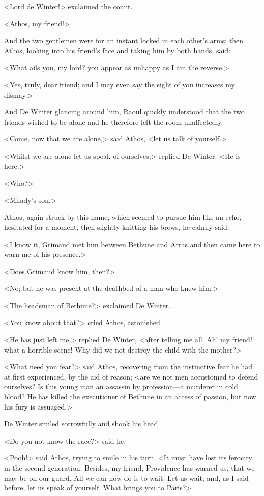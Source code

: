 <Lord de Winter!> exclaimed the count.

<Athos, my friend!>

And the two gentlemen were for an instant locked in each other's arms; then Athos, looking into his friend's face and taking him by both hands, said:

<What ails you, my lord? you appear as unhappy as I am the reverse.>

<Yes, truly, dear friend; and I may even say the sight of you increases my dismay.>

And De Winter glancing around him, Raoul quickly understood that the two friends wished to be alone and he therefore left the room unaffectedly.

<Come, now that we are alone,> said Athos, <let us talk of yourself.>

<Whilst we are alone let us speak of ourselves,> replied De Winter. <He is here.>

<Who?>

<Milady's son.>

Athos, again struck by this name, which seemed to pursue him like an echo, hesitated for a moment, then slightly knitting his brows, he calmly said:

<I know it, Grimaud met him between Bethune and Arras and then came here to warn me of his presence.>

<Does Grimaud know him, then?>

<No; but he was present at the deathbed of a man who knew him.>

<The headsman of Bethune?> exclaimed De Winter.

<You know about that?> cried Athos, astonished.

<He has just left me,> replied De Winter, <after telling me all. Ah! my friend! what a horrible scene! Why did we not destroy the child with the mother?>

<What need you fear?> said Athos, recovering from the instinctive fear he had at first experienced, by the aid of reason; <are we not men accustomed to defend ourselves? Is this young man an assassin by profession—a murderer in cold blood? He has killed the executioner of Bethune in an access of passion, but now his fury is assuaged.>

De Winter smiled sorrowfully and shook his head.

<Do you not know the race?> said he.

<Pooh!> said Athos, trying to smile in his turn. <It must have lost its ferocity in the second generation. Besides, my friend, Providence has warned us, that we may be on our guard. All we can now do is to wait. Let us wait; and, as I said before, let us speak of yourself. What brings you to Paris?>

